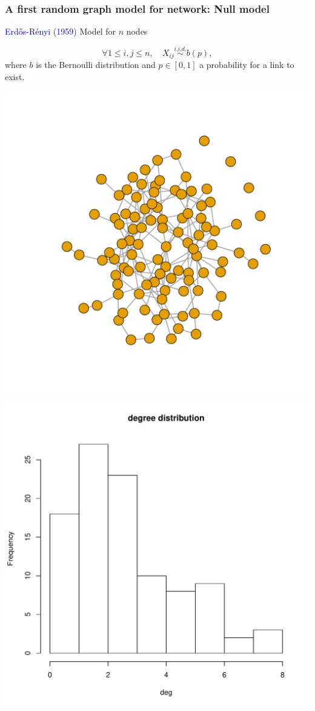 \documentclass[nopagenumber,9pt]{beamer}
\begin{document}
\begin{frame}
\frametitle{A first random graph model for network: Null model}

\textcolor{blue}{Erd\H{o}s-Rényi (1959)} Model for $n$ nodes 

$$\forall 1\le i,j\le n,\quad X_{ij}\overset{i.i.d.}{\sim} b(p),$$
where $b$ is the Bernoulli distribution and $p\in[0,1]$ a probability for a link to exist. 


\begin{center}
 \includegraphics[scale=.3]{plots/ER.pdf} \includegraphics[scale=.3]{plots/degER.pdf}
\end{center}


\end{frame}
\end{document}
